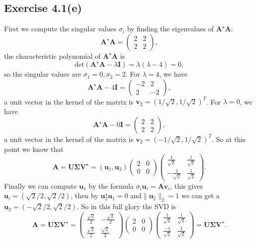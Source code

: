 \documentclass{article}
\begin{document}
\subsection{Exercise 4.1(e)}
First we compute the singular values $\sigma_i$ by finding the eigenvalues of $\bm{A}^\star\bm{A}$:
$$
\bm{A}^\star\bm{A} = \begin{pmatrix}
	2 & 2\\
	2 & 2
\end{pmatrix},
$$
the characteristic polynomial of $\bm{A}^\star \bm{A}$ is
$$
\mathrm{det} (\bm{A}^\star\bm{A} - \lambda \bm{I}) = \lambda(\lambda-4) = 0,
$$
so the singular values are $\sigma_1 = 0, \sigma_2 = 2$.
For $\lambda = 4$, we have
$$
\bm{A}^\star \bm{A} - 4\bm{I}= \begin{pmatrix}
	-2 & 2\\
	2 & -2
\end{pmatrix},
$$
a unit vector in the kernel of the matrix is $\bm{v}_2 = \left(1/\sqrt{2}, 1/\sqrt{2}\right)^T$. For $\lambda = 0$, we have
$$
\bm{A}^\star \bm{A} - 0\bm{I}= \begin{pmatrix}
	2 & 2\\
	2 & 2
\end{pmatrix},
$$
a unit vector in the kernel of the matrix is $\bm{v}_2 = \left(-1/\sqrt{2}, 1/\sqrt{2}\right)^T$. So at this point we know that
$$
\bm{A} = \bm{U\Sigma} \bm{V}^{\star} = \left(\bm{u}_1, \bm{u}_2\right)\begin{pmatrix}
	2 & 0\\
	0 & 0
\end{pmatrix}\begin{pmatrix}
\frac{1}{\sqrt{2}} & \frac{1}{\sqrt{2}}\\
-\frac{1}{\sqrt{2}} & \frac{1}{\sqrt{2}}
\end{pmatrix}.
$$
Finally we can compute $\bm{u}_1$ by the formula $\sigma_i \bm{u}_i = \bm{A} \bm{v}_i$, this gives $\bm{u}_i = \left(\sqrt{2}/2, \sqrt{2}/2\right)$, then by $\bm{u}_2^\star \bm{u}_1 = 0$ and$\| \bm{u}_2\|_2 = 1$ we can get a $\bm{u}_2 = \left(-\sqrt{2}/2, \sqrt{2}/2\right)$. So in this full glory the SVD is
$$
\bm{A} = \bm{U\Sigma} \bm{V}^{\star} = \begin{pmatrix}
	\frac{\sqrt{2}}{2} & -\frac{\sqrt{2}}{2}\\
	\frac{\sqrt{2}}{2} & \frac{\sqrt{2}}{2}
\end{pmatrix}\begin{pmatrix}
	2 & 0\\
	0 & 0
\end{pmatrix}\begin{pmatrix}
	\frac{1}{\sqrt{2}} & \frac{1}{\sqrt{2}}\\
	\frac{-1}{\sqrt{2}} & \frac{1}{\sqrt{2}}
\end{pmatrix} = \bm{U\Sigma V}^{\star}.
$$
\end{document}
